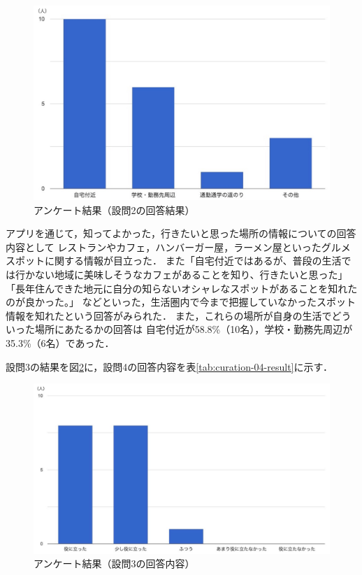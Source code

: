 \documentclass[a4paper]{jsarticle}
\begin{document}
\begin{enumerate}
\begin{enumerate}
\begin{enumerate}
  \fifigure
  \begin{figure}[H]
    \begin{center}
      \includegraphics[width=0.8\hsize]{./images/curation_02_result.jpg}
      \caption{アンケート結果（設問2の回答結果）}
      \label{fig:curation_02_result}
    \end{center}
  \end{figure}
  \fi

  アプリを通じて，知ってよかった，行きたいと思った場所の情報についての回答内容として
  レストランやカフェ，ハンバーガー屋，ラーメン屋といったグルメスポットに関する情報が目立った．
  また「自宅付近ではあるが、普段の生活では行かない地域に美味しそうなカフェがあることを知り、行きたいと思った」「長年住んできた地元に自分の知らないオシャレなスポットがあることを知れたのが良かった。」
  などといった，生活圏内で今まで把握していなかったスポット情報を知れたという回答がみられた．
  また，これらの場所が自身の生活でどういった場所にあたるかの回答は
  自宅付近が58.8\%（10名），学校・勤務先周辺が35.3\%（6名）であった．

  設問3の結果を図\ref{fig:curation_03_result}に，設問4の回答内容を表\ref{tab:curation-04-result}に示す．

  \fifigure
  \begin{figure}[H]
    \begin{center}
      \includegraphics[width=0.8\hsize]{./images/curation_03_result.jpg}
      \caption{アンケート結果（設問3の回答内容）}
      \label{fig:curation_03_result}
    \end{center}
  \end{figure}
  \fi


\end{enumerate}
\end{enumerate}
\end{enumerate}
\end{document}
